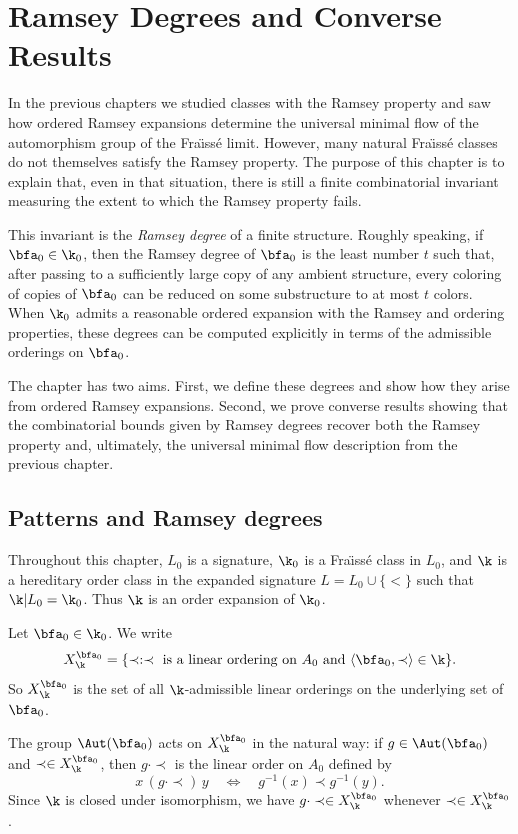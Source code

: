 \chapter{Ramsey Degrees and Converse Results}

In the previous chapters we studied classes with the Ramsey property and saw how ordered Ramsey expansions determine the universal minimal flow of the automorphism group of the Fra\"{\i}ss\'e limit. However, many natural Fra\"{\i}ss\'e classes do not themselves satisfy the Ramsey property. The purpose of this chapter is to explain that, even in that situation, there is still a finite combinatorial invariant measuring the extent to which the Ramsey property fails.

This invariant is the \emph{Ramsey degree} of a finite structure. Roughly speaking, if $\bfa_0\in\k_0$, then the Ramsey degree of $\bfa_0$ is the least number $t$ such that, after passing to a sufficiently large copy of any ambient structure, every coloring of copies of $\bfa_0$ can be reduced on some substructure to at most $t$ colors. When $\k_0$ admits a reasonable ordered expansion with the Ramsey and ordering properties, these degrees can be computed explicitly in terms of the admissible orderings on $\bfa_0$.

The chapter has two aims. First, we define these degrees and show how they arise from ordered Ramsey expansions. Second, we prove converse results showing that the combinatorial bounds given by Ramsey degrees recover both the Ramsey property and, ultimately, the universal minimal flow description from the previous chapter.

\section{Patterns and Ramsey degrees}

Throughout this chapter, $L_0$ is a signature, $\k_0$ is a Fra\"{\i}ss\'e class in $L_0$, and $\k$ is a hereditary order class in the expanded signature \(L=L_0\cup\{<\}\) such that \(\k|L_0=\k_0\).
Thus $\k$ is an order expansion of $\k_0$.

Let $\bfa_0\in\k_0$. We write
\[
    X^{\bfa_0}_{\k}
    =
    \{\prec : \prec \text{ is a linear ordering on }A_0 \text{ and } \langle \bfa_0,\prec\rangle\in\k\}.
\]
So $X^{\bfa_0}_{\k}$ is the set of all $\k$-admissible linear orderings on the underlying set of $\bfa_0$.

The group $\Aut(\bfa_0)$ acts on $X^{\bfa_0}_{\k}$ in the natural way: if $g\in\Aut(\bfa_0)$ and $\prec\in X^{\bfa_0}_{\k}$, then $g\cdot\prec$ is the linear order on $A_0$ defined by
\[
    x\,(g\cdot\prec)\,y
    \quad\Longleftrightarrow\quad
    g^{-1}(x)\prec g^{-1}(y).
\]
Since $\k$ is closed under isomorphism, we have $g\cdot\prec\in X^{\bfa_0}_{\k}$ whenever $\prec\in X^{\bfa_0}_{\k}$.

